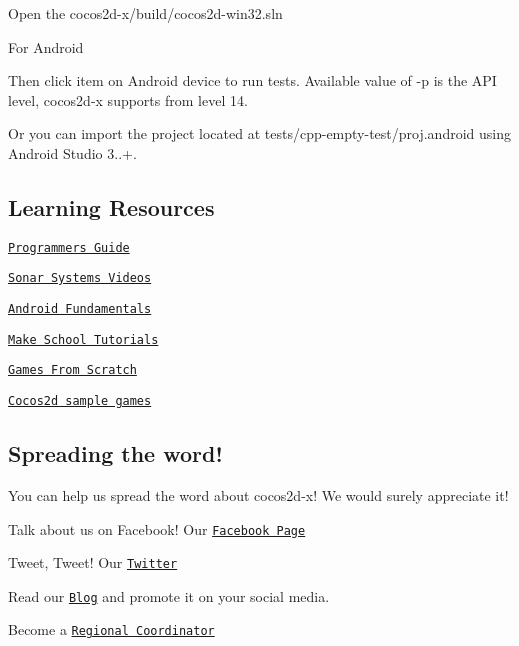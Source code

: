 Open the {\ttfamily cocos2d-\/x/build/cocos2d-\/win32.\+sln}


\begin{DoxyItemize}
\item For Android
\end{DoxyItemize}




Then click item on Android device to run tests. Available value of {\ttfamily -\/p} is the A\+PI level, cocos2d-\/x supports from level 14.

Or you can import the project located at {\ttfamily tests/cpp-\/empty-\/test/proj.\+android} using Android Studio 3..+.

\subsection*{Learning Resources }


\begin{DoxyItemize}
\item \href{http://cocos2d-x.org/docs/programmers-guide/2/index.html}{\tt Programmers Guide}
\item \href{https://www.youtube.com/user/sonarsystemslimited/search?query=cocos2d-x}{\tt Sonar Systems Videos}
\item \href{https://developer.android.com/guide/components/fundamentals.html}{\tt Android Fundamentals}
\item \href{https://www.makeschool.com/tutorials/}{\tt Make School Tutorials}
\item \href{http://www.gamefromscratch.com/page/Cocos2d-x-CPP-Game-Programming-Tutorial-Series.aspx}{\tt Games From Scratch}
\item \href{https://github.com/cocos2d/cocos2d-x-samples}{\tt Cocos2d sample games}
\end{DoxyItemize}

\subsection*{Spreading the word! }

You can help us spread the word about cocos2d-\/x! We would surely appreciate it!


\begin{DoxyItemize}
\item Talk about us on Facebook! Our \href{https://www.facebook.com/cocos2dx/}{\tt Facebook Page}
\item Tweet, Tweet! Our \href{https://twitter.com/cocos2dx}{\tt Twitter}
\item Read our \href{http://blog.cocos2d-x.org/}{\tt Blog} and promote it on your social media.
\item Become a \href{http://discuss.cocos2d-x.org/t/we-need-regional-coordinators/24104}{\tt Regional Coordinator}
\end{DoxyItemize}

